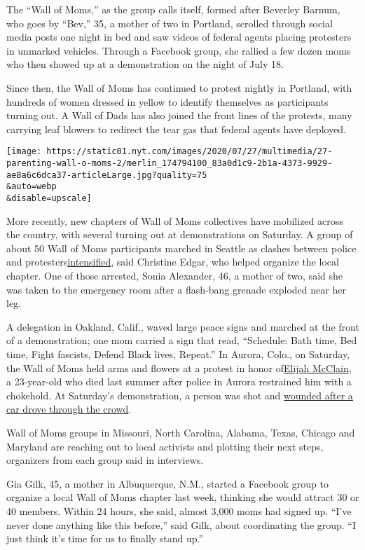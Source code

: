 The ``Wall of Moms,'' as the group calls itself, formed after Beverley
Barnum, who goes by ``Bev,'' 35, a mother of two in Portland, scrolled
through social media posts one night in bed and saw videos of federal
agents placing protesters in unmarked vehicles. Through a Facebook
group, she rallied a few dozen moms who then showed up at a
demonstration on the night of July 18.

Since then, the Wall of Moms has continued to protest nightly in
Portland, with hundreds of women dressed in yellow to identify
themselves as participants turning out. A Wall of Dads has also joined
the front lines of the protests, many carrying leaf blowers to redirect
the tear gas that federal agents have deployed.

\texttt{[image: https://static01.nyt.com/images/2020/07/27/multimedia/27-parenting-wall-o-moms-2/merlin\_174794100\_83a0d1c9-2b1a-4373-9929-ae8a6c6dca37-articleLarge.jpg?quality=75\\\&auto=webp\\\&disable=upscale]}

More recently, new chapters of Wall of Moms collectives have mobilized
across the country, with several turning out at demonstrations on
Saturday. A group of about 50 Wall of Moms participants marched in
Seattle as clashes between police and
protesters\href{https://www.nytimes.com/2020/07/25/us/protests-seattle-portland.html}{intensified},
said Christine Edgar, who helped organize the local chapter. One of
those arrested, Sonia Alexander, 46, a mother of two, said she was taken
to the emergency room after a flash-bang grenade exploded near her leg.

A delegation in Oakland, Calif., waved large peace signs and marched at
the front of a demonstration; one mom carried a sign that read,
``Schedule: Bath time, Bed time, Fight fascists, Defend Black lives,
Repeat.'' In Aurora, Colo., on Saturday, the Wall of Moms held arms and
flowers at a protest in honor
of\href{https://www.nytimes.com/article/who-was-elijah-mcclain.html}{Elijah
McClain}, a 23-year-old who died last summer after police in Aurora
restrained him with a chokehold. At Saturday's demonstration, a person
was shot and
\href{https://www.denverpost.com/2020/07/25/elijah-mcclain-protest-aurora-saturday/}{wounded
after a car drove through the crowd}.

Wall of Moms groups in Missouri, North Carolina, Alabama, Texas, Chicago
and Maryland are reaching out to local activists and plotting their next
steps, organizers from each group said in interviews.

Gia Gilk, 45, a mother in Albuquerque, N.M., started a Facebook group to
organize a local Wall of Moms chapter last week, thinking she would
attract 30 or 40 members. Within 24 hours, she said, almost 3,000 moms
had signed up. ``I've never done anything like this before,'' said Gilk,
about coordinating the group. ``I just think it's time for us to finally
stand up.''

